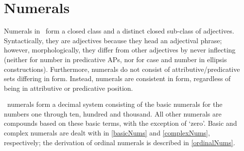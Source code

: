 \section{Numerals}\label{numerals}
Numerals in \PS\ form a closed class and a distinct closed sub-class of adjectives. Syntactically, they are adjectives because they head an adjectival phrase; however, morphologically, they differ from other adjectives by never inflecting (neither for number in predicative APs, nor for case and number in ellipsis constructions). 
Furthermore, numerals do not consist of attributive/predicative sets differing in form. %
Instead, numerals are consistent in form, regardless of being in attributive or predicative position. %

\PS\ numerals form a decimal system consisting of the basic numerals for the numbers one through ten, hundred and thousand. All other numerals are compounds based on these basic terms, with the exception of  ‘zero’. Basic and complex numerals are dealt with in \SEC\ref{basicNums} and \SEC\ref{complexNums}, respectively; the derivation of ordinal numerals is described in \SEC\ref{ordinalNums}. %


